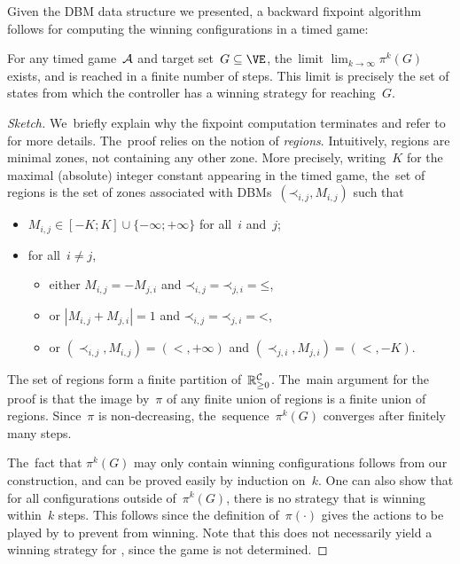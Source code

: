 Given the DBM data structure we presented,
a backward fixpoint algorithm follows for computing the winning configurations in a timed game:

\begin{theorem}
   \label{9-thm:timed-control}
   For any timed game~$\mathcal{A}$ and target set~$G \subseteq \VE$, 
   the~limit $\lim_{k \rightarrow \infty} \pi^k(G)$ exists, and is reached 
   in a finite number of steps. This limit is precisely the set of states from
   which the controller has a winning strategy for reaching~$G$.
\end{theorem}

\begin{proof}[Sketch]
  We~briefly explain why the fixpoint computation terminates and refer
  to~\cite{AMPS98,CDFLL05} for more details.  The~proof relies on the notion of
  \emph{regions}. Intuitively, regions are minimal zones, not
  containing any other zone. More precisely, writing~$K$ for the maximal
  (absolute) integer constant appearing in the timed game, the~set of regions is
  the set of zones associated with
  DBMs~$(\mathord\prec_{i,j},M_{i,j})$ such that
  \begin{itemize}
  \item $M_{i,j}\in [-K; K]\cup\{-\infty;+\infty\}$ for all~$i$ and~$j$;
  \item for all~$i\not=j$,
     \begin{itemize}
    \item either $M_{i,j}=-M_{j,i}$ and
      $\mathord\prec_{i,j}=\mathord\prec_{j,i}=\mathord\leq$,
     \item or $|M_{i,j}+M_{j,i}|=1$ and 
      $\mathord\prec_{i,j}=\mathord\prec_{j,i}=\mathord<$,
    \item or $(\prec_{i,j},M_{i,j})=(<,+\infty)$ and $(\prec_{j,i},M_{j,i})=(<,-K)$.
     \end{itemize}
  \end{itemize}
  The set of regions form a finite partition of~$\mathbb{R}_{\geq 0}^{\mathcal{C}}$.
  The~main argument for the proof is that the
  image by~$\pi$ of any finite union of regions is a finite union of
  regions. Since~$\pi$ is non-decreasing, the~sequence~$\pi^k(G)$
  converges after finitely many steps.

  The~fact that $\pi^k(G)$ may
  only contain winning configurations follows from our construction,
  and can be proved easily by induction on~$k$.
  One can also show that for all configurations outside of~$\pi^k(G)$,
  there is no strategy that is winning within~$k$ steps. This follows since
  the definition of~$\pi(\cdot)$ gives the actions to be played by \Adam to
  prevent \Eve from winning.
  Note that this does not necessarily yield a winning strategy for \Adam,
  since the game is not determined.
\end{proof}

